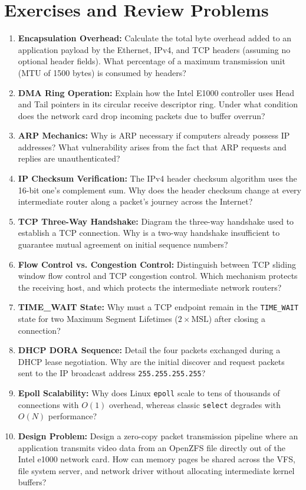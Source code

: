 \section{Exercises and Review Problems}
\label{sec:exercises_chap6}

\begin{enumerate}
    \item \textbf{Encapsulation Overhead:} Calculate the total byte overhead added to an application payload by the Ethernet, IPv4, and TCP headers (assuming no optional header fields). What percentage of a maximum transmission unit (MTU of 1500 bytes) is consumed by headers?
    \item \textbf{DMA Ring Operation:} Explain how the Intel E1000 controller uses Head and Tail pointers in its circular receive descriptor ring. Under what condition does the network card drop incoming packets due to buffer overrun?
    \item \textbf{ARP Mechanics:} Why is ARP necessary if computers already possess IP addresses? What vulnerability arises from the fact that ARP requests and replies are unauthenticated?
    \item \textbf{IP Checksum Verification:} The IPv4 header checksum algorithm uses the 16-bit one's complement sum. Why does the header checksum change at every intermediate router along a packet's journey across the Internet?
    \item \textbf{TCP Three-Way Handshake:} Diagram the three-way handshake used to establish a TCP connection. Why is a two-way handshake insufficient to guarantee mutual agreement on initial sequence numbers?
    \item \textbf{Flow Control vs. Congestion Control:} Distinguish between TCP sliding window flow control and TCP congestion control. Which mechanism protects the receiving host, and which protects the intermediate network routers?
    \item \textbf{TIME\_WAIT State:} Why must a TCP endpoint remain in the \texttt{TIME\_WAIT} state for two Maximum Segment Lifetimes ($2 \times \text{MSL}$) after closing a connection?
    \item \textbf{DHCP DORA Sequence:} Detail the four packets exchanged during a DHCP lease negotiation. Why are the initial discover and request packets sent to the IP broadcast address \texttt{255.255.255.255}?
    \item \textbf{Epoll Scalability:} Why does Linux \texttt{epoll} scale to tens of thousands of connections with $O(1)$ overhead, whereas classic \texttt{select} degrades with $O(N)$ performance?
    \item \textbf{Design Problem:} Design a zero-copy packet transmission pipeline where an application transmits video data from an OpenZFS file directly out of the Intel e1000 network card. How can memory pages be shared across the VFS, file system server, and network driver without allocating intermediate kernel buffers?
\end{enumerate}
